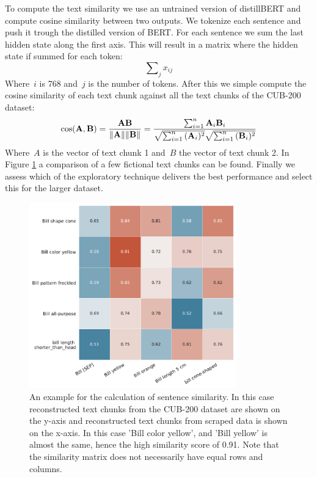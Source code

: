\documentclass[a4paper, 12pt, oneside]{book} %
\begin{document}
To compute the text similarity we use an untrained version of distillBERT and compute cosine similarity between two outputs.
We tokenize each sentence and push it trough the distilled version of BERT.
For each sentence we sum the last hidden state along the first axis.
This will result in a matrix where the hidden state if summed for each token:
\begin{equation}
     \sum\nolimits_{j}^{} x_{ij} 
\end{equation}
Where~$i$ is 768 and~$j$ is the number of tokens. 
After this we simple compute the cosine similarity of each text chunk against all the text chunks of the CUB-200 dataset:
\begin{equation}
\cos ({\bf A},{\bf B})= {{\bf A} {\bf B} \over \|{\bf A}\| \|{\bf B}\|} = \frac{ \sum_{i=1}^{n}{{\bf A}_i{\bf B}_i} }{ \sqrt{\sum_{i=1}^{n}{({\bf A}_i)^2}} \sqrt{\sum_{i=1}^{n}{({\bf B}_i)^2}} }
\end{equation}
Where~$A$ is the vector of text chunk 1 and~$B$ the vector of text chunk 2. 
In Figure \ref{fig:similarity_matrix} a comparison of a few fictional text chunks can be found. 
Finally we assess which of the exploratory technique delivers the best performance and select this for the larger dataset.
\begin{figure} [h!]
    \centering
    \includegraphics[width=0.8\textwidth]{similarity_matrix.pdf}
    \caption[Example of sentence similarity]{An example for the calculation of sentence similarity. 
    In this case reconstructed text chunks from the CUB-200 dataset are shown on the y-axis and reconstructed text chunks from scraped data is shown on the x-axis. In this case 'Bill color yellow', and 'Bill yellow' is almost the same, hence the high similarity score of 0.91. Note that the similarity matrix does not necessarily have equal rows and columns.}
    \label{fig:similarity_matrix}
\end{figure}
\end{document}
